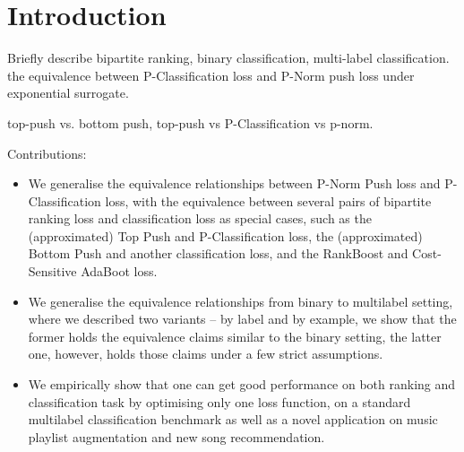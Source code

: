 \section{Introduction}
\label{sec:intro}

{\it



Briefly describe bipartite ranking, binary classification, multi-label classification.
the equivalence between P-Classification loss and P-Norm push loss under exponential surrogate.

top-push vs. bottom push, top-push vs P-Classification vs p-norm.
}

Contributions:
\begin{itemize}
\item We generalise the equivalence relationships between P-Norm Push loss and P-Classification loss, 
      with the equivalence between several pairs of bipartite ranking loss and classification loss as special cases,
      such as the (approximated) Top Push and P-Classification loss, the (approximated) Bottom Push and another classification loss,
      and the RankBoost and Cost-Sensitive AdaBoot loss.
\item We generalise the equivalence relationships from binary to multilabel setting, where we described two variants -- 
      by label and by example, we show that the former holds the equivalence claims similar to the binary setting, 
      the latter one, however, holds those claims under a few strict assumptions.
\item We empirically show that one can get good performance on both ranking and classification task by optimising only one loss function,
      on a standard multilabel classification benchmark as well as a novel application on music playlist augmentation and 
      new song recommendation.
\end{itemize}

